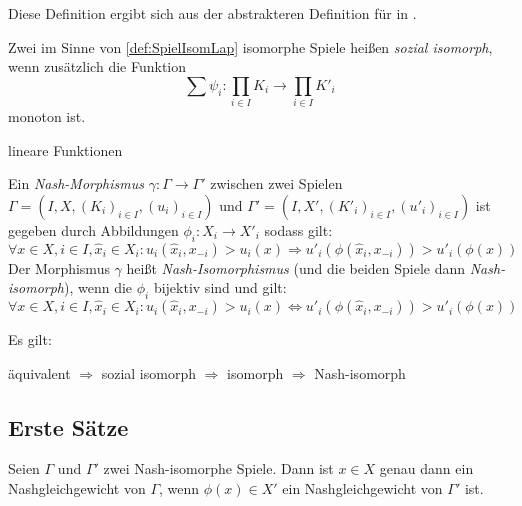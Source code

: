 \begin{bem}
	Diese Definition ergibt sich aus der abstrakteren Definition für  in \cite{LapGameCat}.
\end{bem}

\begin{defn}
	Zwei im Sinne von \cref{def:SpielIsomLap} isomorphe Spiele heißen \emph{sozial isomorph}, wenn zusätzlich die Funktion
		\[\sum \psi_i: \prod_{i \in I}K_i \to \prod_{i \in I} K'_i \]
	monoton ist. 
\end{defn}

\begin{bsp}
	lineare Funktionen
\end{bsp}

\begin{defn}\label{def:NashMorphismus}
	Ein \emph{Nash-Morphismus} $\gamma: \Gamma \to \Gamma'$ zwischen zwei Spielen $\Gamma = (I, X, (K_i)_{i\in I}, (u_i)_{i\in I})$ und $\Gamma' = (I, X', (K'_i)_{i\in I}, (u'_i)_{i\in I})$ ist gegeben durch Abbildungen $\phi_i: X_i \to X'_i$ sodass gilt:
		\[\forall x\in X, i \in I, \hat{x}_i \in X_i: u_i(\hat{x}_i,x_{-i}) > u_i(x) \Rightarrow u'_i(\phi(\hat{x}_i,x_{-i})) > u'_i(\phi(x))\]
	Der Morphismus $\gamma$ heißt \emph{Nash-Isomorphismus} (und die beiden Spiele dann \emph{Nash-isomorph}), wenn die $\phi_i$ bijektiv sind und gilt:
		\[\forall x\in X, i \in I, \hat{x}_i \in X_i: u_i(\hat{x}_i,x_{-i}) > u_i(x) \iff u'_i(\phi(\hat{x}_i,x_{-i})) > u'_i(\phi(x))\]
\end{defn}

\begin{beob}
	Es gilt:
	\begin{center}
		äquivalent $\Rightarrow$ sozial isomorph $\Rightarrow$ isomorph $\Rightarrow$ Nash-isomorph
	\end{center}
\end{beob}


\subsection{Erste Sätze}

\begin{lemma}
	Seien $\Gamma$ und $\Gamma'$ zwei Nash-isomorphe Spiele. Dann ist $x \in X$ genau dann ein Nashgleichgewicht von $\Gamma$, wenn $\phi(x) \in X'$ ein Nashgleichgewicht von $\Gamma'$ ist.
\end{lemma}

